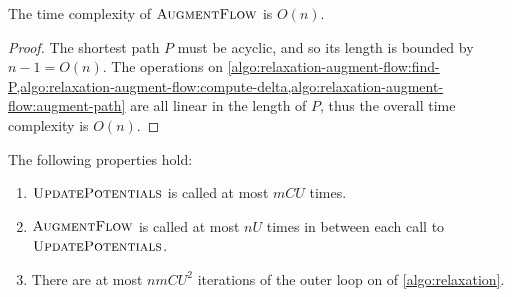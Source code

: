 \begin{lemma} \label{lemma:relax-complexity-augmentflow}
The time complexity of $\textproc{AugmentFlow}$ is $O(n)$.
\end{lemma}
\begin{proof}
The shortest path $P$ must be acyclic, and so its length is bounded by $n-1=O(n)$. The operations on \cref{algo:relaxation-augment-flow:find-P,algo:relaxation-augment-flow:compute-delta,algo:relaxation-augment-flow:augment-path} are all linear in the length of $P$, thus the overall time complexity is $O(n)$.
\end{proof}

\begin{lemma} \label{lemma:relax-iterations} 
The following properties hold:
\begin{enumerate}[label=(\alph*)]
    \item $\textproc{UpdatePotentials}$ is called at most $mCU$ times.
    \item $\textproc{AugmentFlow}$ is called at most $nU$ times in between each call to $\textproc{UpdatePotentials}$.
    \item There are at most $nmCU^2$ iterations of the outer loop on  of \cref{algo:relaxation}.
\end{enumerate}
\end{lemma}
